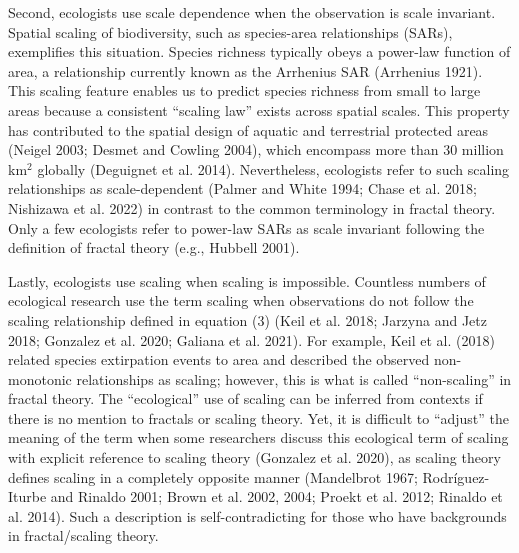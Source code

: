 \documentclass[
  12pt,
]{article}
\begin{document}
Second, ecologists use scale dependence when the observation is scale invariant. Spatial scaling of biodiversity, such as species-area relationships (SARs), exemplifies this situation. Species richness typically obeys a power-law function of area, a relationship currently known as the Arrhenius SAR (Arrhenius 1921). This scaling feature enables us to predict species richness from small to large areas because a consistent ``scaling law'' exists across spatial scales. This property has contributed to the spatial design of aquatic and terrestrial protected areas (Neigel 2003; Desmet and Cowling 2004), which encompass more
than 30 million km\(^2\) globally (Deguignet et al. 2014). Nevertheless, ecologists refer to such scaling relationships as scale-dependent (Palmer and White 1994; Chase et al. 2018; Nishizawa et al. 2022) in contrast to the common terminology in fractal theory. Only a few ecologists refer to power-law SARs as scale invariant following the definition of fractal theory (e.g., Hubbell 2001).

Lastly, ecologists use scaling when scaling is impossible. Countless numbers of ecological research use the term scaling when observations do not follow the scaling relationship defined in equation (3) (Keil et al. 2018; Jarzyna and Jetz 2018; Gonzalez et al. 2020; Galiana et al. 2021). For example, Keil et al. (2018) related species extirpation events to area and described the observed non-monotonic relationships as scaling; however, this is what is called ``non-scaling'' in fractal theory. The ``ecological'' use of scaling can be inferred from contexts if there is no mention to fractals or scaling theory. Yet, it is difficult to ``adjust'' the meaning of the term when some researchers discuss this ecological term of scaling with explicit reference to scaling theory (Gonzalez et al. 2020), as scaling theory defines scaling in a completely opposite manner (Mandelbrot 1967; Rodríguez-Iturbe and Rinaldo 2001; Brown et al. 2002, 2004; Proekt et al. 2012; Rinaldo et al. 2014). Such a description is self-contradicting for those who have backgrounds in fractal/scaling theory.
\end{document}
